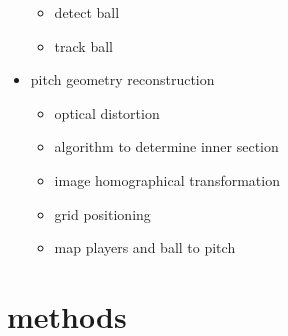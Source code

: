 \documentclass[
11pt,
twoside
]{report}
\begin{document}
\begin{itemize}
  \begin{itemize}
  \item
    detect ball
  \item
    track ball
  \end{itemize}
\item
  pitch geometry reconstruction

  \begin{itemize}
  \item
    optical distortion
  \item
    algorithm to determine inner section
  \item
    image homographical transformation
  \item
    grid positioning
  \item
    map players and ball to pitch
  \end{itemize}
\end{itemize}



\section{methods}
\end{document}
